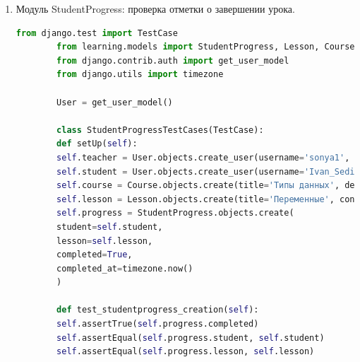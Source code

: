 \begin{enumerate}
\begin{lstlisting}[language=Python, caption=Модульный тест для TestResult, label=lst:testresult_test]
		User = get_user_model()
		
		class TestResultTestCases(TestCase):
		def setUp(self):
		self.teacher = User.objects.create_user(username='sonya1', password='vanya232323', is_teacher=True)
		self.student = User.objects.create_user(username='Ivan_Sedih', password='vanya232323', is_student=True)
		self.course = Course.objects.create(title='Объекты', description='Описание курса', creator=self.teacher)
		self.lesson = Lesson.objects.create(title='Создание объектов', content='Содержимое урока', order=1, course=self.course)
		self.test = Test.objects.create(title='Тест', passing_score=70, lesson=self.lesson)
		self.test_result = TestResult.objects.create(
		student=self.student,
		lesson=self.lesson,
		score=85,
		answers='{"q1": "a1"}',
		attempts=1,
		completed_at=timezone.now()
		)
		
		def test_testresult_creation(self):
		self.assertEqual(self.test_result.score, 85)
		self.assertEqual(self.test_result.student, self.student)
		self.assertEqual(self.test_result.lesson, self.lesson)
	\end{lstlisting}
	
	\item Модуль StudentProgress: проверка отметки о завершении урока.
	\begin{lstlisting}[language=Python, caption=Модульный тест для StudentProgress, label=lst:studentprogress_test]
		from django.test import TestCase
		from learning.models import StudentProgress, Lesson, Course
		from django.contrib.auth import get_user_model
		from django.utils import timezone
		
		User = get_user_model()
		
		class StudentProgressTestCases(TestCase):
		def setUp(self):
		self.teacher = User.objects.create_user(username='sonya1', password='vanya232323', is_teacher=True)
		self.student = User.objects.create_user(username='Ivan_Sedih', password='vanya232323', is_student=True)
		self.course = Course.objects.create(title='Типы данных', description='Описание курса', creator=self.teacher)
		self.lesson = Lesson.objects.create(title='Переменные', content='Содержимое урока', order=1, course=self.course)
		self.progress = StudentProgress.objects.create(
		student=self.student,
		lesson=self.lesson,
		completed=True,
		completed_at=timezone.now()
		)
		
		def test_studentprogress_creation(self):
		self.assertTrue(self.progress.completed)
		self.assertEqual(self.progress.student, self.student)
		self.assertEqual(self.progress.lesson, self.lesson)
	\end{lstlisting}
	

\end{enumerate}

